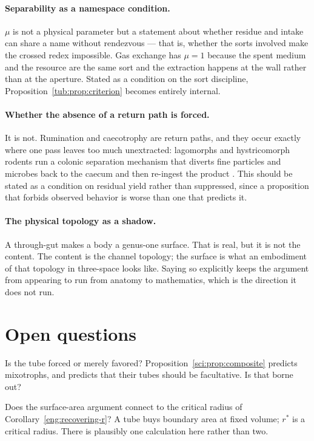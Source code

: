 \paragraph{Separability as a namespace condition.} $\mu$ is not a physical
parameter but a statement about whether residue and intake can share a name
without rendezvous --- that is, whether the sorts involved make the crossed
redex impossible. Gas exchange has $\mu = 1$ because the spent medium and the
resource are the same sort and the extraction happens at the wall rather than at
the aperture. Stated as a condition on the sort discipline,
Proposition~\ref{tub:prop:criterion} becomes entirely internal.

\paragraph{Whether the absence of a return path is forced.} It is not.
Rumination and caecotrophy are return paths, and they occur exactly where one
pass leaves too much unextracted: lagomorphs and hystricomorph rodents run a
colonic separation mechanism that diverts fine particles and microbes back to
the caecum and then re-ingest the product \cite{hirakawa2001}. This should be
stated as a condition on residual yield rather than suppressed, since a
proposition that forbids observed behavior is worse than one that predicts it.

\paragraph{The physical topology as a shadow.} A through-gut makes a body a
genus-one surface. That is real, but it is not the content. The content is the
channel topology; the surface is what an embodiment of that topology in
three-space looks like. Saying so explicitly keeps the argument from appearing
to run from anatomy to mathematics, which is the direction it does not run.

\section{Open questions}
\label{tub:sec:open}

\begin{question}
Is the tube forced or merely favored? Proposition~\ref{sci:prop:composite}
predicts mixotrophs, and predicts that their tubes should be facultative. Is that
borne out?
\end{question}

\begin{question}
Does the surface-area argument connect to the critical radius of
Corollary~\ref{eng:recovering-r}? A tube buys boundary area at fixed volume;
$r^\ast$ is a critical radius. There is plausibly one calculation here rather
than two.
\end{question}

